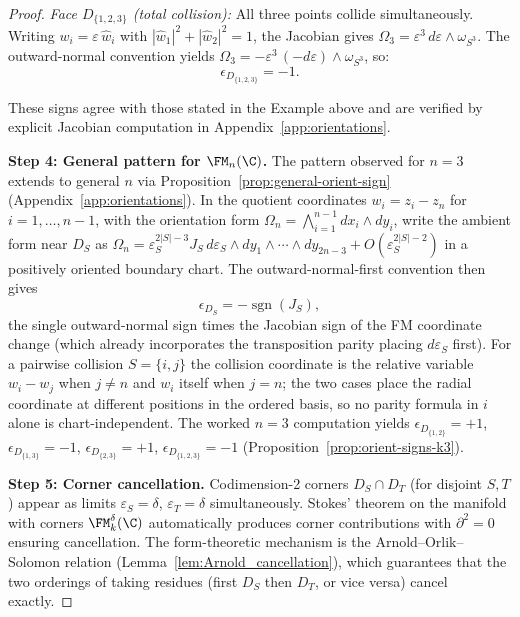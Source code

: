 \begin{proof}
\medskip\noindent\emph{Face $D_{\{1,2,3\}}$ (total collision):}
All three points collide simultaneously. Writing $w_i = \varepsilon\,\hat{w}_i$ with $|\hat{w}_1|^2 + |\hat{w}_2|^2 = 1$, the Jacobian gives $\Omega_3 = \varepsilon^3\, d\varepsilon \wedge \omega_{S^3}$. The outward-normal convention yields $\Omega_3 = -\varepsilon^3\, (-d\varepsilon) \wedge \omega_{S^3}$, so:
\[
\boxed{\epsilon_{D_{\{1,2,3\}}} = -1.}
\]

\medskip\noindent
These signs agree with those stated in the Example above and are verified by explicit Jacobian computation in Appendix~\ref{app:orientations}.

\textbf{Step 4: General pattern for $\FM_n(\C)$.}
The pattern observed for $n = 3$ extends to general $n$ via Proposition~\ref{prop:general-orient-sign} (Appendix~\ref{app:orientations}). In the quotient coordinates $w_i = z_i - z_n$ for $i = 1,\ldots,n-1$, with the orientation form $\Omega_n = \bigwedge_{i=1}^{n-1} dx_i \wedge dy_i$, write the ambient form near $D_S$ as $\Omega_n = \varepsilon_S^{2|S|-3} J_S\, d\varepsilon_S \wedge dy_1\wedge\cdots\wedge dy_{2n-3} + O(\varepsilon_S^{2|S|-2})$ in a positively oriented boundary chart. The outward-normal-first convention then gives
\[
\epsilon_{D_S} = -\operatorname{sgn}(J_S),
\]
the single outward-normal sign times the Jacobian sign of the FM coordinate change (which already incorporates the transposition parity placing $d\varepsilon_S$ first). For a pairwise collision $S = \{i,j\}$ the collision coordinate is the relative variable $w_i - w_j$ when $j \neq n$ and $w_i$ itself when $j = n$; the two cases place the radial coordinate at different positions in the ordered basis, so no parity formula in $i$ alone is chart-independent. The worked $n=3$ computation yields $\epsilon_{D_{\{1,2\}}} = +1$, $\epsilon_{D_{\{1,3\}}} = -1$, $\epsilon_{D_{\{2,3\}}} = +1$, $\epsilon_{D_{\{1,2,3\}}} = -1$ (Proposition~\ref{prop:orient-signs-k3}).

\textbf{Step 5: Corner cancellation.}
Codimension-2 corners $D_S \cap D_T$ (for disjoint $S, T$) appear as limits $\varepsilon_S = \delta$, $\varepsilon_T = \delta$ simultaneously. Stokes' theorem on the manifold with corners $\FM_k^\delta(\C)$ automatically produces corner contributions with $\partial^2 = 0$ ensuring cancellation. The form-theoretic mechanism is the Arnold--Orlik--Solomon relation (Lemma~\ref{lem:Arnold_cancellation}), which guarantees that the two orderings of taking residues (first $D_S$ then $D_T$, or vice versa) cancel exactly.
\end{proof}

